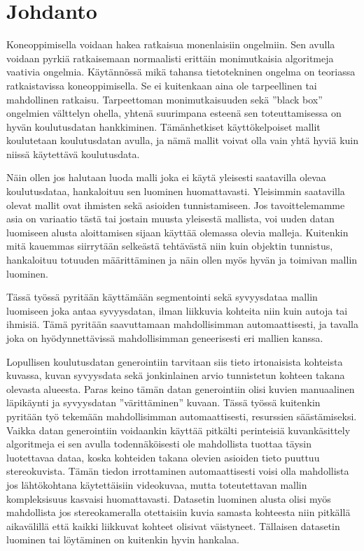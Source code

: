 \chapter{Johdanto}%
\label{ch:johdanto}

Koneoppimisella voidaan hakea ratkaisua monenlaisiin ongelmiin. Sen avulla voidaan pyrkiä ratkaisemaan normaalisti erittäin monimutkaisia algoritmeja vaativia ongelmia. Käytännössä mikä tahansa tietotekninen ongelma on teoriassa ratkaistavissa koneoppimisella. Se ei kuitenkaan aina ole tarpeellinen tai mahdollinen ratkaisu. Tarpeettoman monimutkaisuuden sekä ”black box” ongelmien välttelyn ohella, yhtenä suurimpana esteenä sen toteuttamisessa on hyvän koulutusdatan hankkiminen. Tämänhetkiset käyttökelpoiset mallit koulutetaan koulutusdatan avulla, ja nämä mallit voivat olla vain yhtä hyviä kuin niissä käytettävä koulutusdata.

Näin ollen jos halutaan luoda malli joka ei käytä yleisesti saatavilla olevaa koulutusdataa, hankaloituu sen luominen huomattavasti. Yleisimmin saatavilla olevat mallit ovat ihmisten sekä asioiden tunnistamiseen. Jos tavoittelemamme asia on variaatio tästä tai jostain muusta yleisestä mallista, voi uuden datan luomiseen alusta aloittamisen sijaan käyttää olemassa olevia malleja. Kuitenkin mitä kauemmas siirrytään selkeästä tehtävästä niin kuin objektin tunnistus, hankaloituu totuuden määrittäminen ja näin ollen myös hyvän ja toimivan mallin luominen.

Tässä työssä pyritään käyttämään segmentointi sekä syvyysdataa mallin luomiseen joka antaa syvyysdatan, ilman liikkuvia kohteita niin kuin autoja tai ihmisiä. Tämä pyritään saavuttamaan mahdollisimman automaattisesti, ja tavalla joka on hyödynnettävissä mahdollisimman geneerisesti eri mallien kanssa.

Lopullisen koulutusdatan generointiin tarvitaan siis tieto irtonaisista kohteista kuvassa, kuvan syvyysdata sekä jonkinlainen arvio tunnistetun kohteen takana olevasta alueesta. Paras keino tämän datan generointiin olisi kuvien manuaalinen läpikäynti ja syvyysdatan ”värittäminen” kuvaan. Tässä työssä kuitenkin pyritään työ tekemään mahdollisimman automaattisesti, resurssien säästämiseksi. Vaikka datan generointiin voidaankin käyttää pitkälti perinteisiä kuvankäsittely algoritmeja ei sen avulla todennäköisesti ole mahdollista tuottaa täysin luotettavaa dataa, koska kohteiden takana olevien asioiden tieto puuttuu stereokuvista. Tämän tiedon irrottaminen automaattisesti voisi olla mahdollista jos lähtökohtana käytettäisiin videokuvaa, mutta toteutettavan mallin kompleksisuus kasvaisi huomattavasti. Datasetin luominen alusta olisi myös mahdollista jos stereokameralla otettaisiin kuvia samasta kohteesta niin pitkällä aikavälillä että kaikki liikkuvat kohteet olisivat väistyneet. Tällaisen datasetin luominen tai löytäminen on kuitenkin hyvin hankalaa. 

